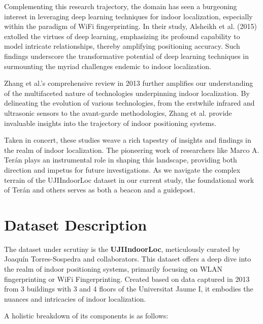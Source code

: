 \documentclass[conference]{IEEEtran}
\begin{document}
Complementing this research trajectory, the domain has seen a burgeoning interest in leveraging deep learning techniques for indoor localization, especially within the paradigm of WiFi fingerprinting. In their study, Alsheikh et al. (2015) extolled the virtues of deep learning, emphasizing its profound capability to model intricate relationships, thereby amplifying positioning accuracy\textcolor{blue}{\cite{alsheikh2015deep}}. Such findings underscore the transformative potential of deep learning techniques in surmounting the myriad challenges endemic to indoor localization.

Zhang et al.'s comprehensive review in 2013 further amplifies our understanding of the multifaceted nature of technologies underpinning indoor localization\textcolor{blue}{\cite{zhang2013comprehensive}}. By delineating the evolution of various technologies, from the erstwhile infrared and ultrasonic sensors to the avant-garde methodologies, Zhang et al. provide invaluable insights into the trajectory of indoor positioning systems.

Taken in concert, these studies weave a rich tapestry of insights and findings in the realm of indoor localization. The pioneering work of researchers like Marco A. Terán plays an instrumental role in shaping this landscape, providing both direction and impetus for future investigations. As we navigate the complex terrain of the UJIIndoorLoc dataset in our current study, the foundational work of Terán and others serves as both a beacon and a guidepost.

\section{Dataset Description}

The dataset under scrutiny is the \textbf{UJIIndoorLoc}, meticulously curated by Joaquín Torres-Sospedra and collaborators\textcolor{blue}{\cite{UJIIndoorLocPap}}. This dataset offers a deep dive into the realm of indoor positioning systems, primarily focusing on WLAN fingerprinting or WiFi Fingerprinting. Created based on data captured in 2013 from 3 buildings with 3 and 4 floors of the Universitat Jaume I, it embodies the nuances and intricacies of indoor localization.

A holistic breakdown of its components is as follows:
\end{document}
